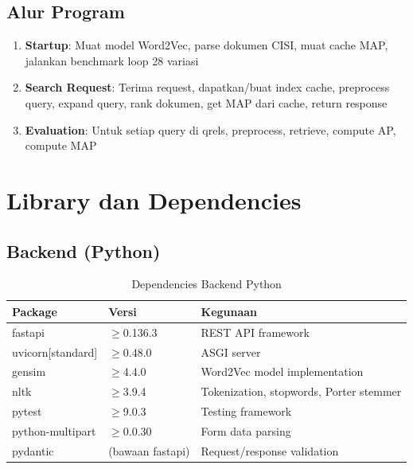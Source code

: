 \documentclass[12pt,a4paper]{report}
\begin{document}
\section{Alur Program}
\begin{enumerate}
    \item \textbf{Startup}: Muat model Word2Vec, parse dokumen CISI, muat cache MAP, jalankan benchmark loop 28 variasi
    \item \textbf{Search Request}: Terima request, dapatkan/buat index cache, preprocess query, expand query, rank dokumen, get MAP dari cache, return response
    \item \textbf{Evaluation}: Untuk setiap query di qrels, preprocess, retrieve, compute AP, compute MAP
\end{enumerate}

\chapter{Library dan Dependencies}

\section{Backend (Python)}
\begin{table}[H]
    \centering
    \begin{tabular}{@{}lll@{}}
        \toprule
        \textbf{Package} & \textbf{Versi} & \textbf{Kegunaan} \\
        \midrule
        fastapi & $\geq$0.136.3 & REST API framework \\
        uvicorn[standard] & $\geq$0.48.0 & ASGI server \\
        gensim & $\geq$4.4.0 & Word2Vec model implementation \\
        nltk & $\geq$3.9.4 & Tokenization, stopwords, Porter stemmer \\
        pytest & $\geq$9.0.3 & Testing framework \\
        python-multipart & $\geq$0.0.30 & Form data parsing \\
        pydantic & (bawaan fastapi) & Request/response validation \\
        \bottomrule
    \end{tabular}
    \caption{Dependencies Backend Python}
\end{table}
\end{document}
